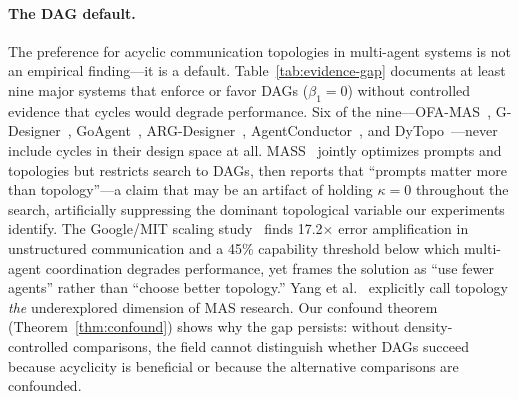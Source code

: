 

\paragraph{The DAG default.}
The preference for acyclic communication topologies in multi-agent
systems is not an empirical finding---it is a default.
Table~\ref{tab:evidence-gap} documents at least nine major systems
that enforce or favor DAGs ($\beta_1 = 0$) without controlled
evidence that cycles would degrade performance.
Six of the nine---OFA-MAS~\cite{ofamas2026},
G-Designer~\cite{gdesigner2025}, GoAgent~\cite{goagent2026},
ARG-Designer~\cite{argdesigner2026},
AgentConductor~\cite{agentconductor2026}, and
DyTopo~\cite{dytopo2026}---never include cycles in their design
space at all.
MASS~\cite{zhou2025mass} jointly optimizes prompts and topologies but
restricts search to DAGs, then reports that ``prompts matter more than
topology''---a claim that may be an artifact of holding $\kappa = 0$
throughout the search, artificially suppressing the dominant
topological variable our experiments identify.
The Google/MIT scaling study~\cite{googlemit2026scaling} finds 17.2$\times$
error amplification in unstructured communication and a 45\% capability
threshold below which multi-agent coordination degrades performance,
yet frames the solution as ``use fewer agents'' rather than ``choose
better topology.''
Yang et al.~\cite{yang2025topology} explicitly call topology
\emph{the} underexplored dimension of MAS research.
Our confound theorem (Theorem~\ref{thm:confound}) shows why the gap
persists: without density-controlled comparisons, the field cannot
distinguish whether DAGs succeed because acyclicity is beneficial or
because the alternative comparisons are confounded.



